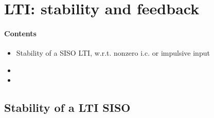 \documentclass[letterpaper,10pt,english]{jupyterBook}
\begin{document}
\chapter{LTI: stability and feedback}
\label{\detokenize{ch/system-theory/lti-stability-and-feedback:lti-stability-and-feedback}}\label{\detokenize{ch/system-theory/lti-stability-and-feedback:ode-lti-stability-fb}}\label{\detokenize{ch/system-theory/lti-stability-and-feedback::doc}}\subsubsection*{Contents}
\begin{itemize}
\item {} 
\sphinxAtStartPar
Stability of a SISO LTI, w.r.t. non\sphinxhyphen{}zero i.c. or impulsive input

\item {} 
\item {} 
\end{itemize}


\section{Stability of a LTI \sphinxhyphen{} SISO}
\label{\detokenize{ch/system-theory/lti-stability-and-feedback:stability-of-a-lti-siso}}\label{\detokenize{ch/system-theory/lti-stability-and-feedback:ode-lti-stability-fb-siso}}
\end{document}
